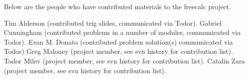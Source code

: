 Below are the people who have contributed materials to the freecalc project.

Tim Alderson (contributed trig slides, communicated via Todor).
Gabriel Cunningham (contributed problems in a number of modules, communicated via Todor).
Evan M. Donato (contributed problem solution(s) communicated via Todor)
Greg Maloney (project member, see svn history for contribution list).
Todor Milev (project member, see svn history for contribution list).
Catalin Zara (project member, see svn history for contribution list).
